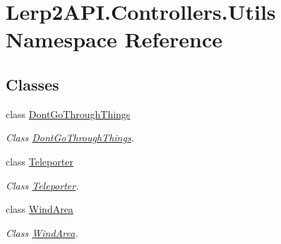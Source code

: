 \hypertarget{namespace_lerp2_a_p_i_1_1_controllers_1_1_utils}{}\section{Lerp2\+A\+P\+I.\+Controllers.\+Utils Namespace Reference}
\label{namespace_lerp2_a_p_i_1_1_controllers_1_1_utils}
\subsection*{Classes}
\begin{DoxyCompactItemize}
\item 
class \hyperlink{class_lerp2_a_p_i_1_1_controllers_1_1_utils_1_1_dont_go_through_things}{Dont\+Go\+Through\+Things}
\begin{DoxyCompactList}\small\item\em Class \hyperlink{class_lerp2_a_p_i_1_1_controllers_1_1_utils_1_1_dont_go_through_things}{Dont\+Go\+Through\+Things}. \end{DoxyCompactList}\item 
class \hyperlink{class_lerp2_a_p_i_1_1_controllers_1_1_utils_1_1_teleporter}{Teleporter}
\begin{DoxyCompactList}\small\item\em Class \hyperlink{class_lerp2_a_p_i_1_1_controllers_1_1_utils_1_1_teleporter}{Teleporter}. \end{DoxyCompactList}\item 
class \hyperlink{class_lerp2_a_p_i_1_1_controllers_1_1_utils_1_1_wind_area}{Wind\+Area}
\begin{DoxyCompactList}\small\item\em Class \hyperlink{class_lerp2_a_p_i_1_1_controllers_1_1_utils_1_1_wind_area}{Wind\+Area}. \end{DoxyCompactList}\end{DoxyCompactItemize}
